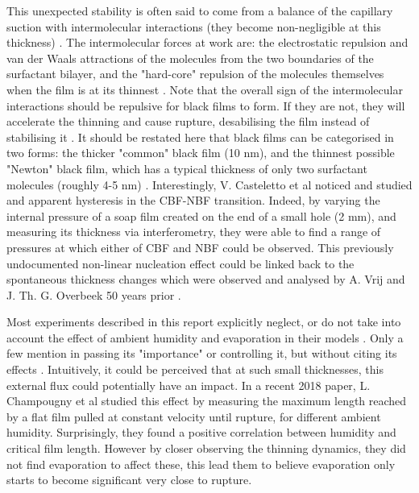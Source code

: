 \documentclass[a4paper,12pt]{article}
\numberwithin{equation}{section}
\numberwithin{figure}{section}
\numberwithin{table}{section}
\begin{document}
This unexpected stability is often said to come from a balance of the capillary suction with intermolecular interactions (they become non-negligible at this thickness) \cite{Breward2002, ChampougnyEvap2018, Cantat2010, Vrij1968, VrijDiscussion1966}. The intermolecular forces at work are: the electrostatic repulsion and van der Waals attractions of the molecules from the two boundaries of the surfactant bilayer, and the "hard-core" repulsion of the molecules themselves when the film is at its thinnest \cite{Casteletto2003}. Note that the overall sign of the intermolecular interactions should be repulsive for black films to form. If they are not, they will accelerate the thinning and cause rupture, desabilising the film instead of stabilising it \cite{VrijDiscussion1966, Langevin1994, Debregeas1998}. It should be restated here that black films can be categorised in two forms: the thicker "common" black film (10 nm), and the thinnest possible "Newton" black film, which has a typical thickness of only two surfactant molecules (roughly 4-5 nm) \cite{Casteletto2003, Seung2006}. Interestingly, V. Casteletto et al \cite{Casteletto2003} noticed and studied and apparent hysteresis in the CBF-NBF transition. Indeed, by varying the internal pressure of a soap film created on the end of a small hole (2 mm), and measuring its thickness via interferometry, they were able to find a range of pressures at which either of CBF and NBF could be observed. This previously undocumented non-linear nucleation effect could be linked back to the spontaneous thickness changes which were observed and analysed by A. Vrij and J. Th. G. Overbeek 50 years prior \cite{Vrij1968}.

Most experiments described in this report explicitly neglect, or do not take into account the effect of ambient humidity and evaporation in their models \cite{Manev1974, Zheng1983}. Only a few mention in passing its "importance" or controlling it, but without citing its effects \cite{Langevin1994}. Intuitively, it could be perceived that at such small thicknesses, this external flux could potentially have an impact. In a recent 2018 paper, L. Champougny et al \cite{ChampougnyEvap2018} studied this effect by measuring the maximum length reached by a flat film pulled at constant velocity until rupture, for different ambient humidity. Surprisingly, they found a positive correlation between humidity and critical film length. However by closer observing the thinning dynamics, they did not find evaporation to affect these, this lead them to believe evaporation only starts to become significant very close to rupture.
\end{document}
